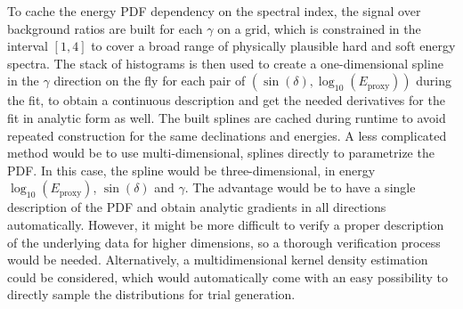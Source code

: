 To cache the energy PDF dependency on the spectral index, the signal over background ratios are built for each $\gamma$ on a grid, which is constrained in the interval $[1, 4]$ to cover a broad range of physically plausible hard and soft energy spectra.
The stack of histograms is then used to create a one-dimensional spline in the $\gamma$ direction on the fly for each pair of $\left(\sin(\delta), \log_{10}\left(E_\text{proxy}\right)\right)$ during the fit, to obtain a continuous description and get the needed derivatives for the fit in analytic form as well.
The built splines are cached during runtime to avoid repeated construction for the same declinations and energies.
A less complicated method would be to use multi-dimensional, splines directly to parametrize the PDF.
In this case, the spline would be three-dimensional, in energy $\log_{10}\left(E_\text{proxy}\right)$, $\sin(\delta)$ and $\gamma$.
The advantage would be to have a single description of the PDF and obtain analytic gradients in all directions automatically.
However, it might be more difficult to verify a proper description of the underlying data for higher dimensions, so a thorough verification process would be needed.
Alternatively, a multidimensional kernel density estimation could be considered, which would automatically come with an easy possibility to directly sample the distributions for trial generation.


